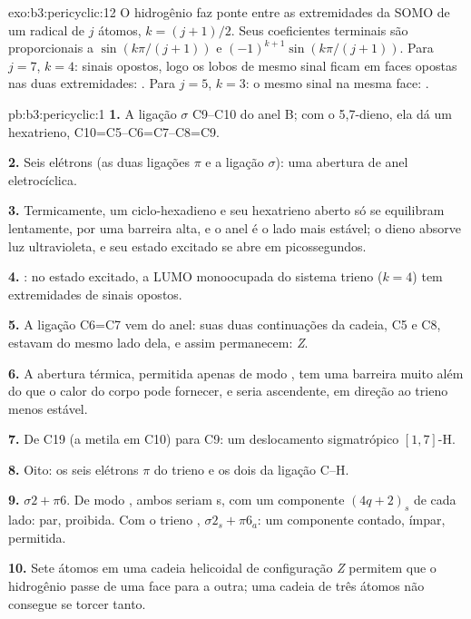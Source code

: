 \begin{solution}{exo:b3:pericyclic:12}
O hidrogênio faz ponte entre as extremidades da SOMO de um radical de $j$ átomos, $k = (j + 1)/2$. Seus coeficientes
terminais são proporcionais a $\sin(k\pi/(j + 1))$ e $(-1)^{k+1}\sin(k\pi/(j + 1))$. Para $j = 7$, $k = 4$: sinais opostos, logo
os lobos de mesmo sinal ficam em faces opostas nas duas extremidades: . Para
$j = 5$, $k = 3$: o mesmo sinal na mesma face: .
\end{solution}

\begin{solution}{pb:b3:pericyclic:1}
\textbf{1.} A ligação $\sigma$ C9--C10 do anel B; com o 5,7-dieno, ela dá um hexatrieno,
C10=C5--C6=C7--C8=C9.

\textbf{2.} Seis elétrons (as duas ligações $\pi$ e a ligação $\sigma$): uma abertura de anel eletrocíclica.

\textbf{3.} Termicamente, um ciclo-hexadieno e seu hexatrieno aberto só se equilibram
lentamente, por uma barreira alta, e o anel é o lado mais estável; o
dieno absorve luz ultravioleta, e seu estado excitado se abre em
picossegundos.

\textbf{4.} : no estado excitado, a LUMO monoocupada do sistema
trieno ($k = 4$) tem extremidades de sinais opostos.

\textbf{5.} A ligação C6=C7 vem do anel: suas duas continuações da cadeia, C5 e C8,
estavam do mesmo lado dela, e assim permanecem: \textit{Z}.

\textbf{6.} A abertura térmica, permitida apenas de modo , tem uma barreira muito além do que
o calor do corpo pode fornecer, e seria ascendente, em direção ao trieno menos estável.

\textbf{7.} De C19 (a metila em C10) para C9: um deslocamento sigmatrópico $[1,7]$-H.

\textbf{8.} Oito: os seis elétrons $\pi$ do trieno e os dois da ligação C--H.

\textbf{9.} $\sigma2 + \pi6$. De modo , ambos seriam s, com um componente $(4q + 2)_s$ de cada lado:
par, proibida. Com o trieno , $\sigma2_s + \pi6_a$: um componente contado, ímpar,
permitida.

\textbf{10.} Sete átomos em uma cadeia helicoidal de configuração \textit{Z} permitem que o hidrogênio passe de uma face para
a outra; uma cadeia de três átomos não consegue se torcer tanto.


\end{solution}
